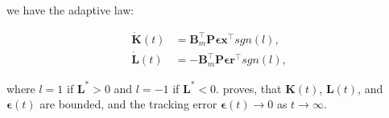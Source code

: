 we have the adaptive law:

\begin{equation}
    \begin{aligned}
        \dot{\mathbf{K}}(t) &= \mathbf{B}_m^\intercal \mathbf{P} \boldsymbol{\epsilon} \mathbf{x}^\intercal sgn(l), \\
        \dot{\mathbf{L}}(t) &= -\mathbf{B}_m^\intercal \mathbf{P} \boldsymbol{\epsilon} \mathbf{r}^\intercal sgn(l),
    \end{aligned}
\end{equation}

where $l=1$ if $\mathbf{L}^*>0$ and $l=-1$ if $\mathbf{L}^*<0$. \textcite{ioannouRobustAdaptiveControl2012} proves, that $\mathbf{K}(t)$, $\mathbf{L}(t)$, and $\boldsymbol{\epsilon}(t)$ are bounded, and the tracking error $\boldsymbol{\epsilon}(t) \to 0$ as $t \to \infty$.